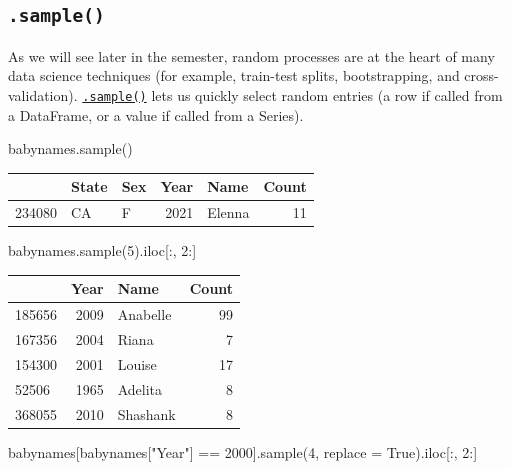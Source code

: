 \documentclass[
  letterpaper,
  DIV=11,
  numbers=noendperiod]{scrreprt}
\newenvironment{Shaded}{\begin{snugshade}}{\end{snugshade}}
\newcommand{\DecValTok}[1]{\textcolor[rgb]{0.68,0.00,0.00}{#1}}
\newcommand{\NormalTok}[1]{\textcolor[rgb]{0.00,0.23,0.31}{#1}}
\newcommand{\OperatorTok}[1]{\textcolor[rgb]{0.37,0.37,0.37}{#1}}
\newcommand{\StringTok}[1]{\textcolor[rgb]{0.13,0.47,0.30}{#1}}
\newcommand{\VariableTok}[1]{\textcolor[rgb]{0.07,0.07,0.07}{#1}}
\begin{document}
\hypertarget{sample}{%
\subsection{\texorpdfstring{\texttt{.sample()}}{.sample()}}\label{sample}}

As we will see later in the semester, random processes are at the heart
of many data science techniques (for example, train-test splits,
bootstrapping, and cross-validation).
\href{https://pandas.pydata.org/docs/reference/api/pandas.DataFrame.sample.html}{\texttt{.sample()}}
lets us quickly select random entries (a row if called from a DataFrame,
or a value if called from a Series).

\begin{Shaded}
\begin{Highlighting}[]
\NormalTok{babynames.sample()}
\end{Highlighting}
\end{Shaded}

\begin{tabular}{lllrlr}
\toprule
{} & State & Sex &  Year &    Name &  Count \\
\midrule
234080 &    CA &   F &  2021 &  Elenna &     11 \\
\bottomrule
\end{tabular}

\begin{Shaded}
\begin{Highlighting}[]
\NormalTok{babynames.sample(}\DecValTok{5}\NormalTok{).iloc[:, }\DecValTok{2}\NormalTok{:]}
\end{Highlighting}
\end{Shaded}

\begin{tabular}{lrlr}
\toprule
{} &  Year &      Name &  Count \\
\midrule
185656 &  2009 &  Anabelle &     99 \\
167356 &  2004 &     Riana &      7 \\
154300 &  2001 &    Louise &     17 \\
52506  &  1965 &   Adelita &      8 \\
368055 &  2010 &  Shashank &      8 \\
\bottomrule
\end{tabular}

\begin{Shaded}
\begin{Highlighting}[]
\NormalTok{babynames[babynames[}\StringTok{"Year"}\NormalTok{] }\OperatorTok{==} \DecValTok{2000}\NormalTok{].sample(}\DecValTok{4}\NormalTok{, replace }\OperatorTok{=} \VariableTok{True}\NormalTok{).iloc[:, }\DecValTok{2}\NormalTok{:]}
\end{Highlighting}
\end{Shaded}
\end{document}
